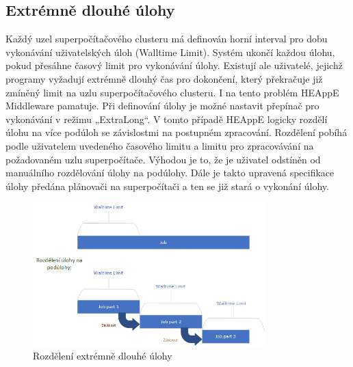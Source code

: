 \subsection{Extrémně dlouhé úlohy}
Každý uzel superpočítačového clusteru má definován horní interval pro dobu vykonávání uživatelských úloh (Walltime Limit). Systém ukončí každou úlohu, pokud přesáhne časový limit pro vykonávání úlohy. Existují ale uživatelé, jejichž programy vyžadují extrémně dlouhý čas pro dokončení, který překračuje již zmíněný limit na uzlu superpočítačového clusteru. I na tento problém HEAppE Middleware pamatuje. Při definování úlohy je možné nastavit přepínač pro vykonávání v režimu „ExtraLong“. V tomto případě HEAppE logicky rozdělí úlohu na více podúloh se závislostmi na postupném zpracování. Rozdělení pobíhá podle uživatelem uvedeného časového limitu a limitu pro zpracovávání na požadovaném uzlu superpočítače. Výhodou je to, že je uživatel odstíněn od manuálního rozdělování úlohy na podúlohy. Dále je takto upravená specifikace úlohy předána plánovači na superpočítači a ten se již stará o vykonání úlohy.

\hfill \break
\begin{figure}[h]
	\centering
	\includegraphics[width=0.8\textwidth]{Figures/job-decompose.png}
	\caption{Rozdělení extrémně dlouhé úlohy }
	\label{fig:rozdeleni-extra-long}
\end{figure}